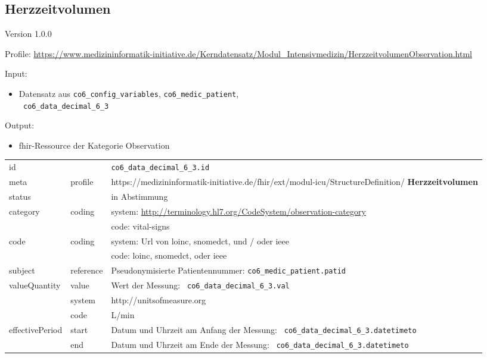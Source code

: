 \subsection{Herzzeitvolumen} 
\noindent Version 1.0.0

\noindent Profile: \url{https://www.medizininformatik-initiative.de/Kerndatensatz/Modul_Intensivmedizin/HerzzeitvolumenObservation.html}

\noindent Input:
\begin{itemize}
	\item Datensatz aus \texttt{co6\_config\_variables}, \texttt{co6\_medic\_patient}, \\ \texttt{
co6\_data\_decimal\_6\_3}
\end{itemize}
Output:
\begin{itemize}
        \item \ac{fhir}-Ressource der Kategorie \glqq Observation\grqq{}
\end{itemize}
\begin{longtable}{|l|l|p{7.5cm}|}
        \hline
        \rowcolor{lightgray} \multicolumn{3}{|l|}{Data Mapping (inhaltlich)} \\ \hline
        id &  & \texttt{co6\_data\_decimal\_6\_3.id} \\ \hline
	meta & profile & https://medizininformatik-initiative.de/fhir/ext/modul-icu/StructureDefinition/\textbf{
Herzzeitvolumen} \\ \hline 
	status &  & in Abstimmung  \\ \hline 
	category & coding & system: \url{http://terminology.hl7.org/CodeSystem/observation-category} \\
\cline{3-3}
	& & code: vital-signs \\ \hline
	code & coding & system: Url von \ac{loinc}, \ac{snomedct}, und / oder \ac{ieee} \\ 
	\cline{3-3} 
	 &  & code: \ac{loinc}, \ac{snomedct}, oder \ac{ieee} \\ \hline
	subject & reference & Pseudonymisierte Patientennummer: \texttt{co6\_medic\_patient.patid} \\ \hline
	valueQuantity & value & Wert der Messung: \texttt{
co6\_data\_decimal\_6\_3.val} \\
        \cline{2-3}
         & system & http://unitsofmeasure.org \\
         \cline{2-3}
         & code &
L/min
\\ \hline
    effectivePeriod & start & Datum und Uhrzeit am Anfang der Messung: \texttt{
co6\_data\_decimal\_6\_3.datetimeto} \\
    \cline{2-3}
     & end & Datum und Uhrzeit am Ende der Messung: \texttt{
co6\_data\_decimal\_6\_3.datetimeto} \\ \hline
\end{longtable}


